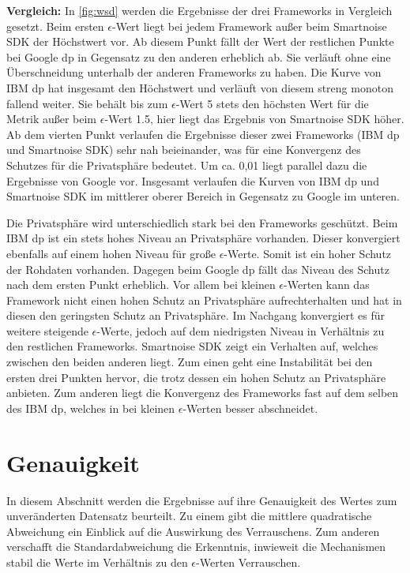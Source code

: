 \textbf{Vergleich: }
In \cref{fig:wsd} werden die Ergebnisse der drei Frameworks in Vergleich gesetzt. Beim ersten $\epsilon$-Wert liegt bei jedem Framework außer beim Smartnoise SDK der Höchstwert vor. Ab diesem Punkt fällt der Wert der restlichen Punkte bei Google \gls{dp} in Gegensatz zu den anderen erheblich ab. Sie verläuft ohne eine Überschneidung unterhalb der anderen Frameworks zu haben. Die Kurve von IBM \gls{dp} hat insgesamt den Höchstwert und verläuft von diesem streng monoton fallend weiter. Sie behält bis zum $\epsilon$-Wert 5 stets den höchsten Wert für die Metrik außer beim $\epsilon$-Wert 1.5, hier liegt das Ergebnis von Smartnoise SDK höher. Ab dem vierten Punkt verlaufen die Ergebnisse dieser zwei Frameworks (IBM \gls{dp} und Smartnoise SDK) sehr nah beieinander, was für eine Konvergenz des Schutzes für die Privatsphäre bedeutet. Um ca. 0,01 liegt parallel dazu die Ergebnisse von Google vor. Insgesamt verlaufen die Kurven von IBM \gls{dp} und Smartnoise SDK im mittlerer oberer Bereich in Gegensatz zu Google im unteren.

Die Privatsphäre wird unterschiedlich stark bei den Frameworks geschützt. Beim IBM \gls{dp} ist ein stets hohes Niveau an Privatsphäre vorhanden. Dieser konvergiert ebenfalls auf einem hohen Niveau für große $\epsilon$-Werte. Somit ist ein hoher Schutz der Rohdaten vorhanden. Dagegen beim Google \gls{dp} fällt das Niveau des Schutz nach dem ersten Punkt erheblich. Vor allem bei kleinen $\epsilon$-Werten kann das Framework nicht einen hohen Schutz an Privatsphäre aufrechterhalten und hat in diesen den geringsten Schutz an Privatsphäre. Im Nachgang konvergiert es für weitere steigende $\epsilon$-Werte, jedoch auf dem niedrigsten Niveau in Verhältnis zu den restlichen Frameworks. Smartnoise SDK zeigt ein Verhalten auf, welches zwischen den beiden anderen liegt. Zum einen geht eine Instabilität bei den ersten drei Punkten hervor, die trotz dessen ein hohen Schutz an Privatsphäre anbieten. Zum anderen liegt die Konvergenz des Frameworks fast auf dem selben des IBM \gls{dp}, welches in bei kleinen $\epsilon$-Werten besser abschneidet.
\newpage
\section{Genauigkeit}
In diesem Abschnitt werden die Ergebnisse auf ihre Genauigkeit des Wertes zum unveränderten Datensatz beurteilt. Zu einem gibt die mittlere quadratische Abweichung ein Einblick auf die Auswirkung des Verrauschens. Zum anderen verschafft die Standardabweichung die Erkenntnis, inwieweit die Mechanismen stabil die Werte im Verhältnis zu den $\epsilon$-Werten Verrauschen. 

